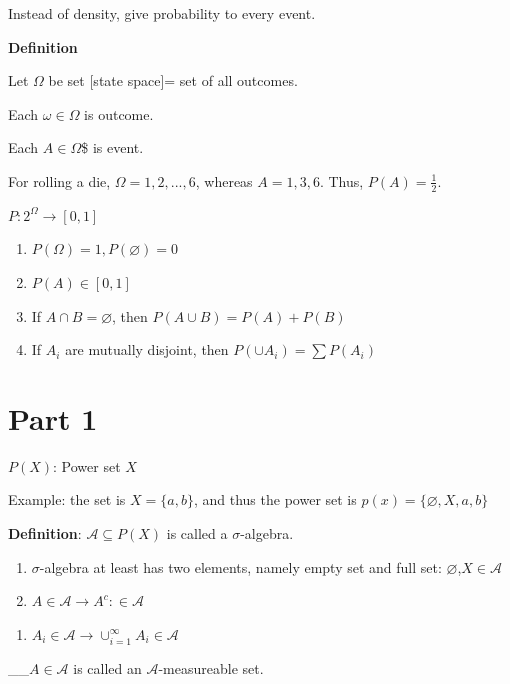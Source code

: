 \documentclass[
]{book}
\providecommand{\tightlist}{%
  \setlength{\itemsep}{0pt}\setlength{\parskip}{0pt}}
\begin{document}
Instead of density, give probability to every event.

\textbf{Definition}

Let \(\Omega\) be set {[}state space{]}= set of all outcomes.

Each \(\omega \in \Omega\) is outcome.

Each \(A \in \Omega\)\$ is event.

For rolling a die, \(\Omega ={1, 2, ...,6}\), whereas \(A={1,3,6}\). Thus, \(P(A)=\frac{1}{2}\).

\(P: 2^\Omega \rightarrow [0,1]\)

\begin{enumerate}
\def\labelenumi{(\arabic{enumi})}
\item
  \(P(\Omega)=1, P(\varnothing)=0\)
\item
  \(P(A) \in [0,1]\)
\item
  If \(A\cap B=\varnothing\), then \(P(A\cup B)=P(A)+P(B)\)
\item
  If \(A_i\) are mutually disjoint, then \(P(\cup A_i)=\sum P(A_i)\)
\end{enumerate}

\hypertarget{part-1}{%
\section{Part 1}\label{part-1}}

\(P(X)\): Power set \(X\)

Example: the set is \(X=\{ a,b \}\), and thus the power set is \(p(x)=\{ \varnothing, X, a,b \}\)

\textbf{Definition}: \(\mathcal{A} \subseteq P(X)\) is called a \(\sigma\)-algebra.

\begin{enumerate}
\def\labelenumi{(\alph{enumi})}
\item
  \(\sigma\)-algebra at least has two elements, namely empty set and full set: \(\varnothing\),\(X \in \mathcal{A}\)
\item
  \(A \in \mathcal{A} \rightarrow A^c: \in \mathcal{A}\)
\end{enumerate}

\begin{enumerate}
\def\labelenumi{(\Alph{enumi})}
\setcounter{enumi}{2}
\tightlist
\item
  \(A_i \in \mathcal{A} \rightarrow \cup_{i=1}^\infty A_i \in \mathcal{A}\)
\end{enumerate}

\_\_\(A \in \mathcal{A}\) is called an \(\mathcal{A}\)-measureable set.
\end{document}
